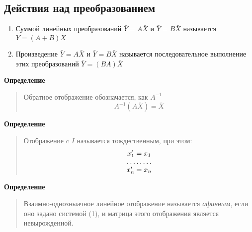 \documentclass[11pt]{proc}
\begin{document}
\subsection{Действия над преобразованием}
	\begin{enumerate}
		\item{Суммой линейных преобразований $\bar{Y}=A\bar{X}$ и $\bar{Y}=B\bar{X}$ называется $\bar{Y}=(A+B)\bar{X}$}
		\item{Произведение $\bar{Y}=A\bar{X}$ и $\bar{Y}=B\bar{X}$ называется последовательное выполнение этих преобразований $\bar{Y}=(BA)\bar{X}$}
	\end{enumerate}
	\textbf{Определение}
	\begin{quote}
		Обратное отображение обозначается, как $A^{-1}$
		\[\boxed{A^{-1}(A\bar{X})=\bar{X}}\]
	\end{quote}
	\textbf{Определение}
	\begin{quote}
		Отображение c $I$ называется тождественным, при этом:
		\[\begin{matrix}x'_1=x_1 \\ \hdotsfor{1} \\ x'_n=x_n\end{matrix}\]
	\end{quote}
	\textbf{Определение}
	\begin{quote}
		Взаимно-однозныачное линейное отображение называется \emph{афинным}, если оно задано системой (1), и матрица этого отображения является невырожденной.
	\end{quote}
\end{document}
